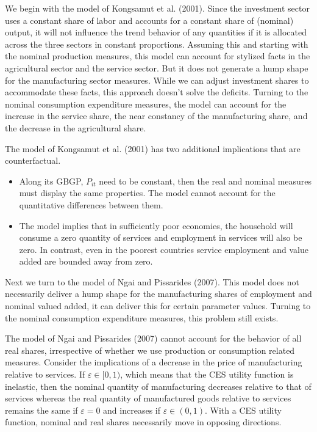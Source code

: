 \documentclass{article}
\begin{document}
    We begin with the model of Kongsamut et al. (2001). Since the investment sector uses a constant share of labor and accounts for a constant share of (nominal) output, it will not influence the trend behavior of any quantities if it is allocated across the three sectors in constant proportions. Assuming this and starting with the nominal production measures, this model can account for stylized facts in the agricultural sector and the service sector. But it does not generate a hump shape for the manufacturing sector measures. While we can adjust investment shares to accommodate these facts, this approach doesn't solve the deficits. Turning to the nominal consumption expenditure measures, the model can account for the increase in the service share, the near constancy of the manufacturing share, and the decrease in the agricultural share.

    The model of Kongsamut et al. (2001) has two additional implications that are counterfactual.
    \begin{itemize}
        \item Along its GBGP, $P_{it}$ need to be constant, then the real and nominal measures must display the same properties. The model cannot account for the quantitative differences between them.
        \item The model implies that in sufficiently poor economies, the household will consume a zero quantity of services and employment in services will also be zero. In contrast, even in the poorest countries service employment and value added are bounded away from zero.
    \end{itemize}

    Next we turn to the model of Ngai and Pissarides (2007). This model does not necessarily deliver a hump shape for the manufacturing shares of employment and nominal valued added, it can deliver this for certain parameter values. Turning to the nominal consumption expenditure measures, this problem still exists.

    The model of Ngai and Pissarides (2007) cannot account for the behavior of all real shares, irrespective of whether we use production or consumption related measures. Consider the implications of a decrease in the price of manufacturing relative to services. If $\varepsilon \in [0, 1)$, which means that the CES utility function is inelastic, then the nominal quantity of manufacturing decreases relative to that of services whereas the real quantity of manufactured goods relative to services remains the same if $\varepsilon = 0$ and increases if $\varepsilon \in (0, 1)$. With a CES utility function, nominal and real shares necessarily move in opposing directions.
\end{document}
